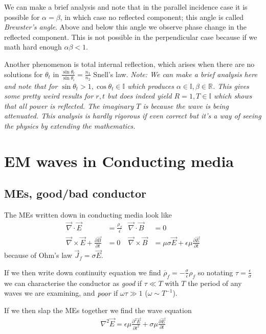 \documentclass[10pt,twocolumn]{article}
\newcommand{\pd}[2]{\frac{\partial#1}{\partial#2}}
\newcommand{\ptd}[2]{\frac{\partial^2 #1}{\partial#2^2}}
\begin{document}
We can make a brief analysis and note that in the parallel incidence case it is possible for $\alpha = \beta$, in which case no reflected component; this angle is called \emph{Brewster's angle}. Above and below this angle we observe phase change in the reflected component. This is not possible in the perpendicular case because if we math hard enough $\alpha \beta < 1$. 

Another phenomenon is total internal reflection, which arises when there are no solutions for $\theta_t$ in $\frac{\sin \theta_t}{\sin \theta_i} = \frac{n_1}{n_2}$ Snell's law. {\em \small Note: We can make a brief analysis here and note that for $\sin \theta_t > 1, \cos \theta_t \in \mathbb{I}$ which produces $\alpha \in \mathbb{I}, \beta \in \mathbb{R}$. This gives some pretty weird results for $r,t$ but does indeed yield $R = 1, T \in \mathbb{I}$ which shows that all power is reflected. The imaginary $T$ is because the wave is being attenuated. This analysis is hardly rigorous if even correct but it's a way of seeing the physics by extending the mathematics.}

\section{EM waves in Conducting media}

\subsection{MEs, good/bad conductor}
The MEs written down in conducting media look like
\begin{align}
    \vec{\nabla} \cdot \vec{E} &= \frac{\rho_f}{\epsilon} & \vec{\nabla} \cdot \vec{B} &= 0\\
    \vec{\nabla} \times \vec{E} + \pd{\vec{B}}{t} &= 0 & \vec{\nabla} \times \vec{B} &= \mu \sigma \vec{E} + \epsilon \mu \pd{\vec{E}}{t}
\end{align}
because of Ohm's law $\vec{J}_f = \sigma \vec{E}$.

If we then write down continuity equation we find $\dot{\rho_f} = -\frac{\sigma}{\epsilon}\rho_f$ so notating $\tau = \frac{\epsilon}{\sigma}$ we can characterise the conductor as \emph{good} if $\tau \ll T$ with $T$ the period of any waves we are examining, and $\emph{poor}$ if $\omega \tau \gg 1$ ($\omega \sim T^{-1}$).

If we then slap the MEs together we find the wave equation
\begin{align}
    \nabla^2 \vec{E} = \epsilon \mu \ptd{\vec{E}}{t} + \sigma \mu \pd{\vec{E}}{t}\label{CondME}
\end{align}
\end{document}
